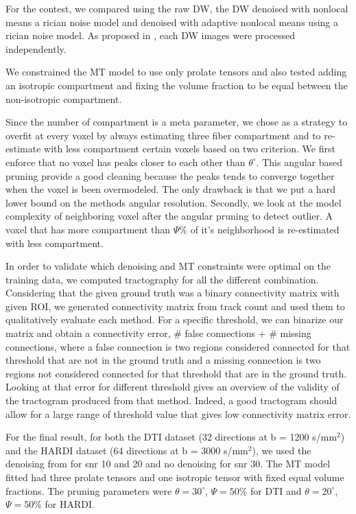 \documentclass[9pt,conference,a4paper]{IEEEtran}
\begin{document}
\bigskip

For the contest, we compared using the raw DW, the DW denoised with nonlocal means a rician noise model and denoised with adaptive nonlocal means \cite{manjon-coupe:10} using a rician noise model. 
As proposed in \cite{descoteaux-wiest-daessle-etal:08}, each DW images were processed independently. 

We constrained the MT model to use only prolate tensors and also tested adding an isotropic compartment and fixing the volume fraction to be equal between the non-isotropic compartment.

Since the number of compartment is a meta parameter, we chose as a strategy to overfit at every voxel by always estimating three fiber compartment and to re-estimate with less compartment certain voxels based on two criterion.
We first enforce that no voxel has peaks closer to each other than $\theta^\circ$.
This angular based pruning provide a good cleaning because the peaks tends to converge together when the voxel is been overmodeled.
The only drawback is that we put a hard lower bound on the methods angular resolution.
Secondly, we look at the model complexity of neighboring voxel after the angular pruning to detect outlier. 
A voxel that has more compartment than $\Psi$\% of it's neighborhood is re-estimated with less compartment.

In order to validate which denoising and MT constraints were optimal on the training data, we computed tractography for all the different combination.
Considering that the given ground truth was a binary connectivity matrix with given ROI, we generated connectivity matrix from track count and used them to qualitatively evaluate each method.
For a specific threshold, we can binarize our matrix and obtain a connectivity error, $\#$ false connections + $\#$ missing connections, where a false connection is two regions considered connected for that threshold that are not in the ground truth and a missing connection is two regions not considered connected for that threshold that are in the ground truth.
Looking at that error for different threshold gives an overview of the validity of the tractogram produced from that method.
Indeed, a good tractogram should allow for a large range of threshold value that gives low connectivity matrix error.

\bigskip

For the final result, for both the DTI dataset (32 directions at b = 1200 s/mm$^2$) and the HARDI dataset (64 directions at b = 3000 s/mm$^2$), we used the denoising from \cite{manjon-coupe:10} for snr 10 and 20 and no denoising for snr 30. The MT model fitted had three prolate tensors and one isotropic tensor with fixed equal volume fractions. 
The pruning parameters were $\theta = 30^\circ$, $\Psi = 50$\% for DTI and $\theta = 20^\circ$, $\Psi = 50$\% for HARDI.
\end{document}
